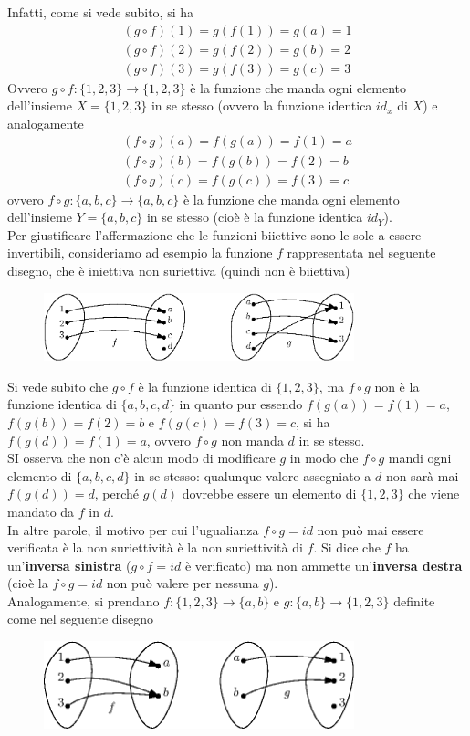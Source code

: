 Infatti, come si vede subito, si ha
\begin{eqnarray*}
  (g\circ f)(1)=g(f(1))=g(a)=1\\
  (g\circ f)(2)=g(f(2))=g(b)=2\\ 
  (g\circ f)(3)=g(f(3))=g(c)=3
\end{eqnarray*}
Ovvero $g\circ f: \{1,2,3\}\to \{1,2,3\}$ è la funzione che manda ogni elemento dell'insieme $X=\{1,2,3\}$ in se
stesso (ovvero la funzione identica $id_x$ di $X$) e analogamente
\begin{eqnarray*}
  (f\circ g)(a)=f(g(a))=f(1)=a\\
  (f\circ g)(b)=f(g(b))=f(2)=b\\ 
  (f\circ g)(c)=f(g(c))=f(3)=c
\end{eqnarray*}
ovvero $f \circ g: \{a,b,c\}\to \{a,b,c\}$ è la funzione che manda ogni elemento dell'insieme $Y=\{a,b,c\}$ in se
stesso (cioè è la funzione identica $id_Y$).\\
Per giustificare l'affermazione che le funzioni biiettive sono le sole a essere invertibili, consideriamo ad
esempio la funzione $f$ rappresentata nel seguente disegno, che è iniettiva non suriettiva (quindi non è
biiettiva)
\begin{figure}[ht]
  \centering
  \includegraphics[width=9cm]{img/finiti/imgex4-5-2.eps}
\end{figure}

Si vede subito che $g\circ f$ è la funzione identica di $\{1,2,3\}$, ma $f\circ g$ non è la funzione identica di
$\{a,b,c,d\}$ in quanto pur essendo $f(g(a))=f(1)=a$, $f (g(b)) = f (2) = b$ e $f(g(c)) = f (3) = c$, si ha
$f(g(d))=f(1)=a$, ovvero $f\circ g$ non manda $d$ in se stesso.\\
SI osserva che non c'è alcun modo di modificare $g$ in modo che $f\circ g$ mandi ogni elemento di $\{a,b,c,d\}$
in se stesso: qualunque valore assegniato a $d$ non sarà mai $f(g(d))=d$, perché $g(d)$ dovrebbe essere un
elemento di $\{1,2,3\}$ che viene mandato da $f$ in $d$.\\
In altre parole, il motivo per cui l'ugualianza $f\circ g =id$ non può mai essere verificata è la non suriettività
è la non suriettività di $f$. Si dice che $f$ ha un'\textbf{inversa sinistra} ($g\circ f=id$ è verificato) ma non
ammette un'\textbf{inversa destra} (cioè la $f\circ g= id$ non può valere per nessuna $g$).\\
Analogamente, si prendano $f:\{1,2,3\}\to \{a,b\}$ e $g:\{a,b\}\to \{1,2,3\}$ definite come nel seguente disegno
\begin{figure}[ht]
  \centering
  \includegraphics[width=9cm]{img/finiti/imgex4-5-3.eps}
\end{figure}

